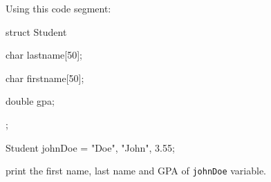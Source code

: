 Using this code segment:



\begin{consolethree}[escapeinside=||]

struct Student

{

    char lastname[50];

    char firstname[50];

    double gpa;

};



Student johnDoe = {"Doe", "John", 3.55};

\end{consolethree}



print the first name, last name and GPA of \texttt{johnDoe} variable.

